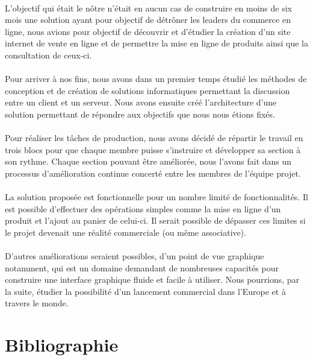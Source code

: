 \documentclass[a4paper, 12pt]{article}
\begin{document}
\paragraph{}L’objectif qui était le nôtre n’était en aucun cas de construire en moins de six mois une solution ayant pour objectif de détrôner les leaders du commerce en ligne, nous avions pour objectif de découvrir et d’étudier la création d’un site internet de vente en ligne et de permettre la mise en ligne de produits ainsi que la consultation de ceux-ci.
\paragraph{}Pour arriver à nos fins, nous avons dans un premier temps étudié les méthodes de conception et de création de solutions informatiques permettant la discussion entre un client et un serveur. Nous avons ensuite créé l’architecture d’une solution permettant de répondre aux objectifs que nous nous étions fixés.
\paragraph{}Pour réaliser les tâches de production, nous avons décidé de répartir le travail en trois blocs pour que chaque membre puisse s'instruire et développer sa section à son rythme. Chaque section pouvant être améliorée, nous l’avons fait dans un processus d’amélioration continue concerté entre les membres de l’équipe projet.
\paragraph{}La solution proposée est fonctionnelle pour un nombre limité de fonctionnalités. Il est possible d'effectuer des opérations simples comme la mise en ligne d’un produit et l’ajout au panier de celui-ci. Il serait possible de dépasser ces limites si le projet devenait une réalité commerciale (ou même associative).
\paragraph{}D’autres améliorations seraient possibles, d’un point de vue graphique notamment, qui est un domaine demandant de nombreuses capacités pour construire une interface graphique fluide et facile à utiliser. Nous pourrions, par la suite, étudier la possibilité d’un lancement commercial dans l’Europe et à travers le monde.


\newpage
\section{Bibliographie}


\end{document}
